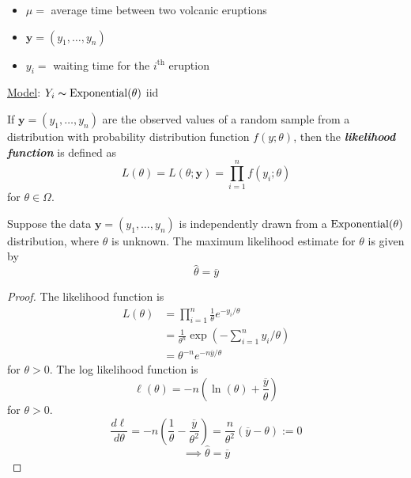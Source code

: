 \begin{exbox}
    \begin{example} $ \; $
        \begin{itemize}
            \item $ \mu= $ average time between two volcanic eruptions
            \item $ \bm{y}=(y_1,\ldots ,y_n) $
            \item $ y_i= $ waiting time for the $ i^{\text{th}} $ eruption
        \end{itemize}
        \underline{Model}: $ Y_i \thicksim \operatorname{Exponential}(\theta) $ iid
    \end{example}
\end{exbox}

\begin{defbox}
    \begin{definition}
        If $ \bm{y}=(y_1,\ldots ,y_n) $ are the observed values of a random sample from a distribution with
        probability distribution function $ f(y;\theta) $, then the \textbf{\emph{likelihood function}}
        is defined as
        \[ L(\theta)=L(\theta;\bm{y})=\prod_{i=1}^n f(y_i;\theta) \]
        for $ \theta\in\Omega $.
    \end{definition}
\end{defbox}

\begin{thmbox}
    \begin{prop}
        Suppose the data $ \bm{y}=(y_1,\ldots ,y_n) $ is independently
        drawn from a $ \operatorname{Exponential}(\theta) $ distribution, where $ \theta $ is unknown.
        The maximum likelihood estimate for $ \theta $ is given by
        \[ \hat{\theta}=\overline{y} \]
    \end{prop}
\end{thmbox}
\begin{proof}
    The likelihood function is
    \begin{align*}
        L(\theta)
         & =\prod_{i=1}^n \frac{1}{\theta} e^{-y_i/\theta}                        \\
         & =\frac{1}{\theta^n} \exp\left(-\sum\limits_{i=1}^{n} y_i/\theta\right) \\
         & =\theta^{-n}e^{-n\overline{y}/\theta}
    \end{align*}
    for $ \theta>0 $. The log likelihood function is
    \[ \ell(\theta)=-n\left( \ln(\theta)+\frac{\overline{y}}{\theta} \right) \]
    for $ \theta>0 $.
    \[ \frac{d\ell}{d\theta} =-n\left( \frac{1}{\theta} -\frac{\overline{y}}{\theta^2} \right)=
        \frac{n}{\theta^2} \left( \overline{y}-\theta \right):=0 \]
    \[ \implies \hat{\theta}=\overline{y} \]
\end{proof}

